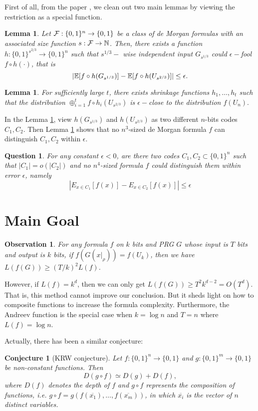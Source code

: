 \documentclass[12pt]{article}
\newtheorem{lemma}[theorem]{Lemma}
\newtheorem{q}[theorem]{Question}
\newtheorem{ob}[theorem]{Observation}
\newtheorem{conjecture}[theorem]{Conjecture}
\renewcommand{\.}{,\ldots,}
\begin{document}
First of all, from the paper \cite{impagliazzo2012pseudorandomness}, we clean out two main lemmas by viewing the restriction as a special function. 
\begin{lemma}\label{main lemma for PRG from shrinkage}
Let $\mathcal{F}:\{0,1\}^n\rightarrow \{0,1\}$ be a class of de Morgan formulas with an associated size function $s:\mathcal{F} \rightarrow \mathbb{N}$. Then, there exists a function $h:\{0,1\}^{s^{2/3}}\rightarrow \{0,1\}^n$ such that $s^{1/3}-$ wise independent input $G_{s^{1/3}}$ could $\epsilon-$fool $f\circ h(\cdot )$, that is 
$$|\mathbb{E}[f\circ h(G_{s^{1/3}})]-\mathbb{E}[f\circ h(U_{s^{2/3}})]|\leq \epsilon.$$
\end{lemma}

\begin{lemma}
For sufficiently large $t$, there exists shrinkage functions $h_1\.h_t$ such that the distribution $\oplus_{i=1}^t f\circ h_i(U_{s^{2/3}})$ is $\epsilon-$close to the distribution $f(U_{n}).$
\end{lemma}

In the Lemma \ref{main lemma for PRG from shrinkage}, view $h(G_{s^{1/3}})$ and $h(U_{s^{2/3}})$ as two different $n$-bits codes $C_1,C_2$. Then Lemma \ref{main lemma for PRG from shrinkage} shows that no $n^3$-sized de Morgan formula $f$ can distinguish $C_1,C_2$ within $\epsilon$.

\begin{q}
For any constant $\epsilon<0$, are there two codes $C_1,C_2\subset \{0,1\}^n$ such that $|C_1|=o(|C_2|)$ and no $n^4$-sized formula $f$ could distinguish them within error $\epsilon$, namely 
$$|E_{x\in C_1}[f(x)]-E_{x\in C_2}[f(x)]|\leq \epsilon$$
\end{q}

\section{Main Goal}
\begin{ob}
	For any formula $f$ on $k$ bits and PRG $G$ whose input is $T$ bits and output is $k$ bits, if $f( G(x|_\rho))=f(U_k)$, then we have 
	$L(f (G))\geq (T/k)^2 L(f)$.
\end{ob}
However, if $L(f)=k^d$, then we can only get $L(f(G))\geq T^2k^{d-2}=O(T^d) $. That is, this method cannot improve our conclusion. But it sheds light on how to composite functions to increase the formula complexity.   Furthermore, the Andreev function is the special case when $k=\log n$ and $T=n$ where $L(f)=\log n$. 


Actually, there has been a similar conjecture: 
\begin{conjecture}[KRW conjecture]
Let $f : \{0, 1\}^n\rightarrow \{0, 1\}$ and $g : \{0, 1\}^m \rightarrow \{0, 1\}$ be non-constant functions. Then
$$D(g \circ f) \simeq D(g) + D(f),$$
where $D(f)$ denotes the depth of $f$ and $g\circ f$ represents the composition of functions, i.e. $g\circ f=g(f(\overline{x_1}),\ldots, f(\overline{x_m}))$, in which $\overline{x_i}$ is the vector of $n$ distinct variables. 
\end{conjecture}
\end{document}
